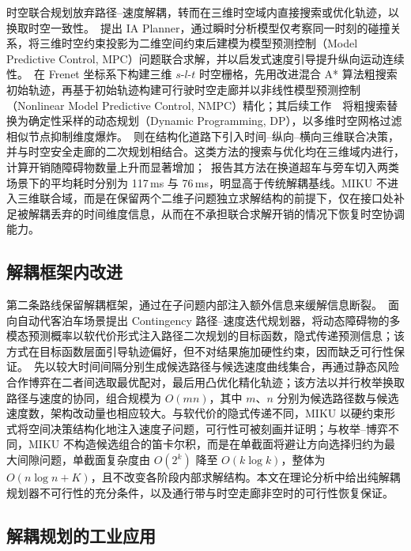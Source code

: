 \documentclass[a4paper,11pt]{ctexart}
\theoremstyle{definition}
\begin{document}
时空联合规划放弃路径--速度解耦，转而在三维时空域内直接搜索或优化轨迹，以换取时空一致性。\citet{yang2021_ia_planner}~提出 IA Planner，通过瞬时分析模型仅考察同一时刻的碰撞关系，将三维时空约束投影为二维空间约束后建模为模型预测控制（Model Predictive Control, MPC）问题联合求解，并以启发式速度引导提升纵向运动连续性。\citet{hu2023_hybrid_astar_slt}~在 Frenet 坐标系下构建三维 $s$-$l$-$t$ 时空栅格，先用改进混合 A* 算法粗搜索初始轨迹，再基于初始轨迹构建可行驶时空走廊并以非线性模型预测控制（Nonlinear Model Predictive Control, NMPC）精化；其后续工作~\citep{hu2025_dp_nmpc}~将粗搜索替换为确定性采样的动态规划（Dynamic Programming, DP），以多维时空网格过滤相似节点抑制维度爆炸。\citet{qiao2025stjoint}~则在结构化道路下引入时间--纵向--横向三维联合决策，并与时空安全走廊的二次规划相结合。这类方法的搜索与优化均在三维域内进行，计算开销随障碍物数量上升而显著增加；\citet{hu2023_hybrid_astar_slt}~报告其方法在换道超车与旁车切入两类场景下的平均耗时分别为 117\,ms 与 76\,ms，明显高于传统解耦基线。MIKU 不进入三维联合域，而是在保留两个二维子问题独立求解结构的前提下，仅在接口处补足被解耦丢弃的时间维度信息，从而在不承担联合求解开销的情况下恢复时空协调能力。

\subsection{解耦框架内改进}
\label{sec:related-decoupled}

第二条路线保留解耦框架，通过在子问题内部注入额外信息来缓解信息断裂。\citet{han2026_contingency}~面向自动代客泊车场景提出 Contingency 路径--速度迭代规划器，将动态障碍物的多模态预测概率以软代价形式注入路径二次规划的目标函数，隐式传递预测信息；该方式在目标函数层面引导轨迹偏好，但不对结果施加硬性约束，因而缺乏可行性保证。\citet{zhang2023_dp_rcg}~先以较大时间间隔分别生成候选路径与候选速度曲线集合，再通过静态风险合作博弈在二者间选取最优配对，最后用凸优化精化轨迹；该方法以并行枚举换取路径与速度的协同，组合规模为 $O(mn)$，其中 $m$、$n$ 分别为候选路径数与候选速度数，架构改动量也相应较大。与软代价的隐式传递不同，MIKU 以硬约束形式将空间决策结构化地注入速度子问题，可行性可被刻画并证明；与枚举--博弈不同，MIKU 不构造候选组合的笛卡尔积，而是在单截面将避让方向选择归约为最大间隙问题，单截面复杂度由 $O(2^k)$ 降至 $O(k\log k)$，整体为 $O(n\log n + K)$，且不改变各阶段内部求解结构。本文在理论分析中给出纯解耦规划器不可行性的充分条件，以及通行带与时空走廊非空时的可行性恢复保证。

\subsection{解耦规划的工业应用}
\label{sec:related-industrial}
\end{document}
